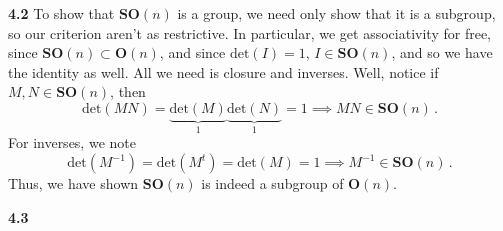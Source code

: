 \documentclass[10pt]{article}
\begin{document}
\textbf{4.2} To show that $\textbf{SO}(n)$ is a group, we need only show that it is a subgroup, so our criterion aren't as restrictive. In particular, we get associativity for free, since $\textbf{SO}(n) \subset \textbf{O}(n)$, and since $\text{det}(I) = 1$, $I \in \textbf{SO}(n)$, and so we have the identity as well. All we need is closure and inverses. Well, notice if $M,N \in \textbf{SO}(n)$, then
\[ \text{det}(MN) = \underbrace{\text{det}(M)}_{1}\underbrace{\text{det}(N)}_{1} = 1 \implies MN \in \textbf{SO}(n) \, .\]
For inverses, we note
\[ \text{det}(M^{-1}) = \text{det}(M^{t}) = \text{det}(M) = 1 \implies M^{-1} \in \textbf{SO}(n)\, .\]
Thus, we have shown $\textbf{SO}(n)$ is indeed a subgroup of $\textbf{O}(n)$.

\textbf{4.3} 
\end{document}
